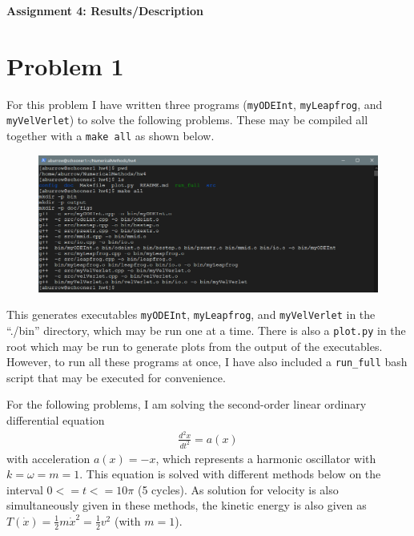 \documentclass[12pt]{article}
\begin{document}
\begin{center}\begin{LARGE}
\textbf{Assignment 4: Results/Description}
\end{LARGE}\end{center}

\section*{Problem 1}

For this problem I have written three programs (\texttt{myODEInt},
\texttt{myLeapfrog}, and \texttt{myVelVerlet}) to solve the following problems.
These may be compiled all together with a \texttt{make all} as shown below.

\begin{figure}[H]
    \centering
    \includegraphics[width=1\textwidth]{compile}
    \label{fig:compile}
\end{figure}

This generates executables \texttt{myODEInt}, \texttt{myLeapfrog}, and
\texttt{myVelVerlet} in the ``./bin'' directory, which may be run one at a time.
There is also a \texttt{plot.py} in the root which may be run to generate plots
from the output of the executables. However, to run all these programs at once,
I have also included a \texttt{run\_full} bash script that may be executed for
convenience.

For the following problems, I am solving the second-order linear ordinary
differential equation
$$
\begin{aligned}
\frac{d^2x}{dt^2} = a(x)
\end{aligned}
$$
with acceleration $a(x) = -x$, which represents a harmonic oscillator with
$k=\omega=m=1$. This equation is solved with different methods below on the
interval $0 <= t <= 10\pi$ (5 cycles). As solution for velocity is also
simultaneously given in these methods, the kinetic energy is also given as
$T(\dot{x}) = \frac{1}{2} m\dot{x}^2 = \frac{1}{2} v^2$ (with $m=1$).
\end{document}
